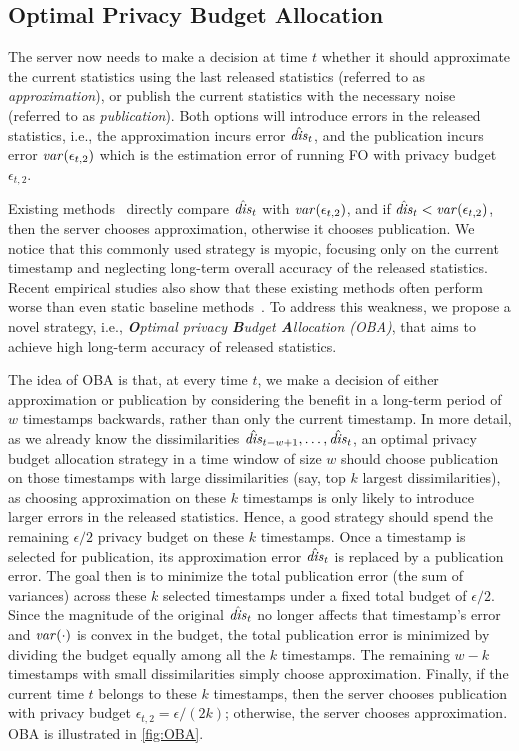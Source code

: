 \subsection{Optimal Privacy Budget Allocation}
\label{ss:optimal_budget}

The server now needs to make a decision at time $t$ whether it should
approximate the current statistics using the last released statistics (referred
to as \emph{approximation}), or publish the current statistics with the necessary
noise (referred to as \emph{publication}).
Both options will introduce errors in the released statistics, i.e., the
approximation incurs error $\hat{\mathit{dis}}_t$, and the publication incurs error
$\mathit{var}(\epsilon_{t,2})$ which is the estimation error of running FO with privacy
budget $\epsilon_{t,2}$.

Existing methods~\cite{Kellaris2014,Ren2022} directly compare $\hat{\mathit{dis}}_t$ with
$\mathit{var}(\epsilon_{t,2})$, and if
$\hat{\mathit{dis}}_t<\mathit{var}(\epsilon_{t,2})$, then the server chooses approximation, otherwise it chooses
publication.
We notice that this commonly used strategy is myopic, focusing only on the current
timestamp and neglecting long-term overall accuracy of the released
statistics.
Recent empirical studies also show that these existing methods often perform
worse than even static baseline methods~\cite{Schaler2024}.
To address this weakness, we propose a novel strategy, i.e.,
\emph{\textbf{O}ptimal privacy \textbf{B}udget \textbf{A}llocation (OBA)}, that
aims to achieve high long-term accuracy of released statistics.

The idea of OBA is that, at every time $t$, we make a decision of either
approximation or publication by considering the benefit in a long-term period of
$w$ timestamps backwards, rather than only the current timestamp.
In more detail, as we already know the dissimilarities $\hat{\mathit{dis}}_{t-w+1}, \ldots,
\hat{\mathit{dis}}_t$, an optimal privacy budget allocation strategy in a time window of size
$w$ should choose publication on those timestamps with large dissimilarities
(say, top $k$ largest dissimilarities), as choosing approximation on these $k$
timestamps is only likely to introduce larger errors in the released statistics.
Hence, a good strategy should spend the remaining $\epsilon/2$ privacy budget on
these $k$ timestamps.
Once a timestamp is selected for publication, its approximation error $\hat{\mathit{dis}}_t$ is replaced by a publication error. The goal then is to minimize the total publication error (the sum of variances) across these $k$ selected timestamps under a fixed total budget of $\epsilon/2$. Since the magnitude of the original $\hat{\mathit{dis}}_t$ no longer affects that timestamp’s error and $\mathit{var}(\cdot)$ is convex in the budget, the total publication error is minimized by dividing the budget equally among all the $k$ timestamps.
The remaining $w-k$ timestamps with small dissimilarities simply choose
approximation.
Finally, if the current time $t$ belongs to these $k$ timestamps, then the server
chooses publication with privacy budget $\epsilon_{t,2}=\epsilon/(2k)$;
otherwise, the server chooses approximation.
OBA is illustrated in \cref{fig:OBA}.

